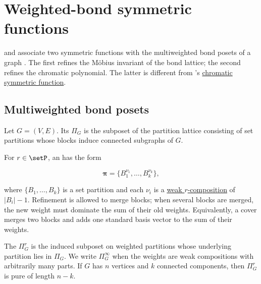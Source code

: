 

\section[weightedBondSymmetric]{Weighted-bond symmetric functions}

 and  associate two
symmetric functions with the multiweighted bond posets of a graph
\cite{DLeonWachs2026x}.  The first refines the Möbius invariant of the bond
lattice; the second refines the chromatic polynomial.  The latter is different
from 's
\hyperref[chromaticSymmetricFunction]{chromatic symmetric function}.


\subsection[weightedBondPoset]{Multiweighted bond posets}

Let \(G=(V,E)\).  Its \label{bondLattice} \(\Pi_G\) is the
subposet of the partition lattice consisting of set partitions whose blocks
induce connected subgraphs of \(G\).

For \(r\in\setP\), an  has the form

\[
  \boldsymbol{\pi}
  =\{B_1^{\nu_1},\dotsc,B_k^{\nu_k}\},
\]

where \(\{B_1,\dotsc,B_k\}\) is a set partition and each \(\nu_i\) is a
\hyperref[weakCompositionDefinition]{weak \(r\)-composition} of
\(\lvert B_i\rvert-1\).  Refinement is allowed to merge blocks; when several
blocks are merged, the new weight must dominate the sum of their old weights.
Equivalently, a cover merges two blocks and adds one standard basis vector to
the sum of their weights.

The  \(\Pi_G^r\) is the induced subposet on
weighted partitions whose underlying partition lies in \(\Pi_G\).  We write
\(\Pi_G^\infty\) when the weights are weak compositions with arbitrarily many
parts.  If \(G\) has \(n\) vertices and \(k\) connected components, then
\(\Pi_G^r\) is pure of length \(n-k\).


